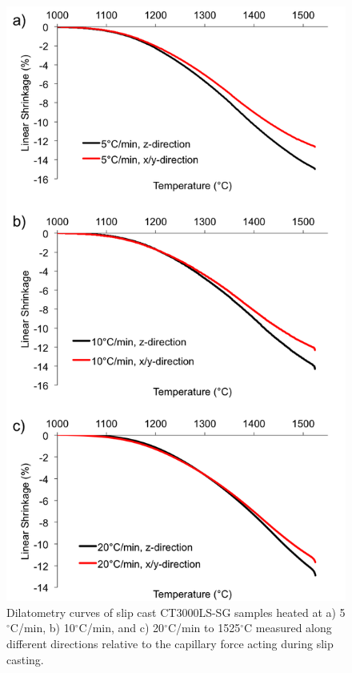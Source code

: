 \newpage
\begin{figure}[H]
	\centering
	\includegraphics[width=\textwidth]{Chapter-6/Figures/Figure1.png}
	\caption{Dilatometry curves of slip cast CT3000LS-SG samples heated at a) 5$^{\circ}$C/min, b) 10$^{\circ}$C/min, and c) 20$^{\circ}$C/min to 1525$^{\circ}$C measured along different directions relative to the capillary force acting during slip casting.}
	\label{Ch6-figure:Figure1}
\end{figure}

